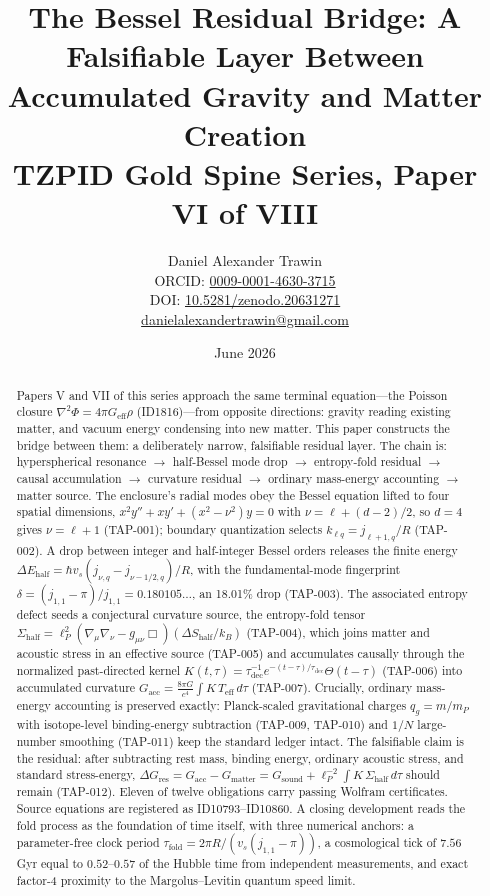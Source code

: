 \documentclass[11pt]{article}
\title{The Bessel Residual Bridge: A Falsifiable Layer Between Accumulated Gravity and Matter Creation\\[0.6em]
\large TZPID Gold Spine Series, Paper VI of VIII}
\author{Daniel Alexander Trawin\\
\small ORCID: \href{https://orcid.org/0009-0001-4630-3715}{0009-0001-4630-3715}\\
\small DOI: \href{https://doi.org/10.5281/zenodo.20631271}{10.5281/zenodo.20631271}\\
\small \href{mailto:danielalexandertrawin@gmail.com}{danielalexandertrawin@gmail.com}}
\date{June 2026}
\theoremstyle{remark}
\begin{document}
\maketitle

\begin{abstract}
Papers V and VII of this series approach the same terminal equation---the Poisson closure $\nabla^2\Phi = 4\pi G_{\mathrm{eff}}\rho$ (ID1816)---from opposite directions: gravity reading existing matter, and vacuum energy condensing into new matter. This paper constructs the bridge between them: a deliberately narrow, falsifiable residual layer. The chain is: hyperspherical resonance $\to$ half-Bessel mode drop $\to$ entropy-fold residual $\to$ causal accumulation $\to$ curvature residual $\to$ ordinary mass-energy accounting $\to$ matter source. The enclosure's radial modes obey the Bessel equation lifted to four spatial dimensions, $x^2 y'' + x y' + (x^2 - \nu^2)y = 0$ with $\nu = \ell + (d-2)/2$, so $d = 4$ gives $\nu = \ell + 1$ (TAP-001); boundary quantization selects $k_{\ell q} = j_{\ell+1,q}/R$ (TAP-002). A drop between integer and half-integer Bessel orders releases the finite energy $\Delta E_{\mathrm{half}} = \hbar v_s (j_{\nu,q} - j_{\nu - 1/2,q})/R$, with the fundamental-mode fingerprint $\delta = (j_{1,1} - \pi)/j_{1,1} = 0.180105\ldots$, an 18.01\% drop (TAP-003). The associated entropy defect seeds a conjectural curvature source, the entropy-fold tensor $\Sigma_{\mathrm{half}} = \ell_P^2 (\nabla_\mu \nabla_\nu - g_{\mu\nu}\Box)(\Delta S_{\mathrm{half}}/k_B)$ (TAP-004), which joins matter and acoustic stress in an effective source (TAP-005) and accumulates causally through the normalized past-directed kernel $K(t,\tau) = \tau_{\mathrm{dec}}^{-1} e^{-(t-\tau)/\tau_{\mathrm{dec}}}\Theta(t-\tau)$ (TAP-006) into accumulated curvature $G_{\mathrm{acc}} = \frac{8\pi G}{c^4}\int K\, T_{\mathrm{eff}}\, d\tau$ (TAP-007). Crucially, ordinary mass-energy accounting is preserved exactly: Planck-scaled gravitational charges $q_g = m/m_P$ with isotope-level binding-energy subtraction (TAP-009, TAP-010) and $1/N$ large-number smoothing (TAP-011) keep the standard ledger intact. The falsifiable claim is the residual: after subtracting rest mass, binding energy, ordinary acoustic stress, and standard stress-energy, $\Delta G_{\mathrm{res}} = G_{\mathrm{acc}} - G_{\mathrm{matter}} = G_{\mathrm{sound}} + \ell_P^{-2}\int K\, \Sigma_{\mathrm{half}}\, d\tau$ should remain (TAP-012). Eleven of twelve obligations carry passing Wolfram certificates. Source equations are registered as ID10793--ID10860. A closing development reads the fold process as the foundation of time itself, with three numerical anchors: a parameter-free clock period $\tau_{\mathrm{fold}} = 2\pi R / (v_s (j_{1,1} - \pi))$, a cosmological tick of $7.56$ Gyr equal to $0.52$--$0.57$ of the Hubble time from independent measurements, and exact factor-4 proximity to the Margolus--Levitin quantum speed limit.
\end{abstract}
\end{document}
